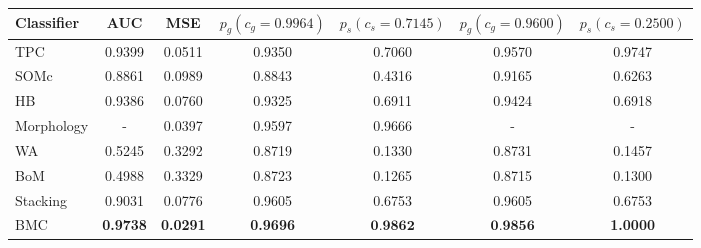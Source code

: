 \begin{tabular}{l c c c c c c}
  Classifier & AUC & MSE &
  $p_{g}\left(c_g=0.9964\right)$ & $p_{s}\left(c_s=0.7145\right)$ &
  $p_{g}\left(c_g=0.9600\right)$ & $p_{s}\left(c_s=0.2500\right)$ \\
  \hline
  TPC        & 0.9399 & 0.0511 & 0.9350 & 0.7060 & 0.9570 & 0.9747 \\
  SOMc       & 0.8861 & 0.0989 & 0.8843 & 0.4316 & 0.9165 & 0.6263 \\
  HB         & 0.9386 & 0.0760 & 0.9325 & 0.6911 & 0.9424 & 0.6918 \\
  Morphology & - & 0.0397 & 0.9597 & 0.9666 & - & - \\
  WA         & 0.5245 & 0.3292 & 0.8719 & 0.1330 & 0.8731 & 0.1457 \\
  BoM        & 0.4988 & 0.3329 & 0.8723 & 0.1265 & 0.8715 & 0.1300 \\
  Stacking   & 0.9031 & 0.0776 & 0.9605 & 0.6753 & 0.9605 & 0.6753 \\
  BMC        & \textbf{0.9738} & \textbf{0.0291} & \textbf{0.9696} &
  $\textbf{0.9862}$ & $\textbf{0.9856}$ & \textbf{1.0000} \\
\end{tabular}
